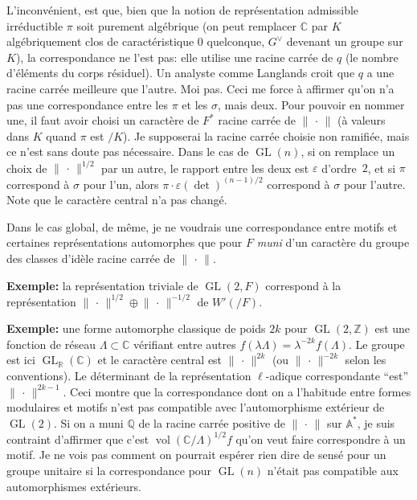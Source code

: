\documentclass[11pt,a4paper]{article}
\theoremstyle{plain}
\theoremstyle{definition}
\DeclareMathOperator{\vol}{vol}
\DeclareMathOperator{\GL}{GL}
\newcommand{\norm}[1]{\lVert#1\rVert}
\begin{document}
L'inconv\'{e}nient, est que, bien que la notion de repr\'{e}sentation admissible irr\'{e}ductible $\pi$ soit purement alg\'{e}brique (on peut remplacer $\mathbb C$ par $K$ alg\'{e}briquement clos de caract\'{e}ristique $0$ quelconque, $G^\vee$ devenant un groupe sur $K$), la correspondance ne l'est pas: elle utilise une racine carr\'{e}e de $q$ (le nombre d'\'{e}l\'{e}ments du corps r\'{e}siduel). Un analyste comme Langlands croit que $q$ a une racine carr\'{e}e meilleure que l'autre. Moi pas. Ceci me force \`{a} affirmer qu'on n'a pas une correspondance entre les $\pi$ et les $\sigma$, mais deux. Pour pouvoir en nommer une, il faut avoir choisi un caract\`{e}re de $F^*$ racine carr\'{e}e de $\norm{\,\cdot\,}$ (\`{a} valeurs dans $K$ quand $\pi$ est $/K$). Je supposerai la racine carr\'{e}e choisie non ramifi\'{e}e, mais ce n'est sans doute pas n\'{e}cessaire. Dans le cas de $\GL(n)$, si on remplace un choix de $\norm{\,\cdot\,}^{1/2}$ par un autre, le rapport entre les deux est $\varepsilon$ d'ordre~$2$, et si $\pi$ correspond \`{a} $\sigma$ pour l'un, alors $\pi \cdot \varepsilon(\det)^{(n-1)/2}$ correspond \`{a} $\sigma$ pour l'autre. Note que le caract\`{e}re central n'a pas chang\'{e}.

Dans le cas global, de m\^{e}me, je ne voudrais une correspondance entre motifs et certaines repr\'{e}sentations automorphes que pour $F$ \emph{muni} d'un caract\`{e}re du groupe des classes d'id\`{e}le racine carr\'{e}e de $\norm{\,\cdot\,}$.

\smallskip
\textbf{Exemple:} la repr\'{e}sentation triviale de $\GL(2,F)$ correspond \`{a} la repr\'{e}sentation $\norm{\,\cdot\,}^{1/2} \oplus \norm{\,\cdot\,}^{-1/2}$ de $W'(/F)$.

\smallskip
\textbf{Exemple:} une forme automorphe classique de poids $2k$ pour $\GL(2,\mathbb Z)$ est une fonction de r\'{e}seau $\Lambda \subset \mathbb C$ v\'{e}rifiant entre autres $f(\lambda\Lambda) = \lambda^{-2k}f(\Lambda)$. Le groupe est ici $\GL_{\mathbb R}(\mathbb C)$ et le caract\`{e}re central est $\norm{\,\cdot\,}^{2k}$ (ou $\norm{\,\cdot\,}^{-2k}$ selon les conventions). Le d\'{e}terminant de la repr\'{e}sentation $\ell$-adique correspondante ``est'' $\norm{\,\cdot\,}^{2k-1}$. Ceci montre que la correspondance dont on a l'habitude entre formes modulaires et motifs n'est pas compatible avec l'automorphisme ext\'{e}rieur de $\GL(2)$. Si on a muni $\mathbb Q$ de la racine carr\'{e}e positive de $\norm{\,\cdot\,}$ sur $\mathbb A^*$, je suis contraint d'affirmer que c'est $\vol(\mathbb C/\Lambda)^{1/2} f$ qu'on veut faire correspondre \`{a} un motif. Je ne vois pas comment on pourrait esp\'{e}rer rien dire de sens\'{e} pour un groupe unitaire si la correspondance pour $\GL(n)$ n'\'{e}tait pas compatible aux automorphismes ext\'{e}rieurs.
\end{document}
